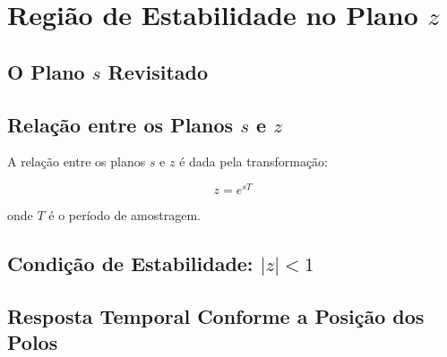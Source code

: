 \chapter{Região de Estabilidade no Plano \texorpdfstring{$z$}{z}}
\label{cap:planoz}

\section{O Plano \texorpdfstring{$s$}{s} Revisitado}


\section{Relação entre os Planos \texorpdfstring{$s$}{s} e \texorpdfstring{$z$}{z}}

A relação entre os planos $s$ e $z$ é dada pela transformação:

\begin{equation}
    z = e^{sT}
    \label{eq:mapeamento}
\end{equation}

\noindent onde $T$ é o período de amostragem.


\section{Condição de Estabilidade: \texorpdfstring{$|z| < 1$}{|z| < 1}}


\section{Resposta Temporal Conforme a Posição dos Polos}

